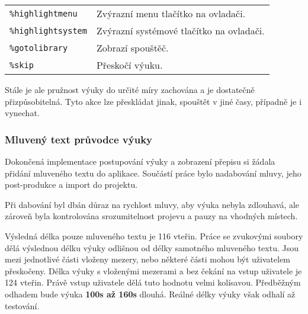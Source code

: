 \begin{longtable}[]{@{}ll@{}}
\begin{minipage}[t]{0.05\columnwidth}
\texttt{\%highlightmenu}\strut
\end{minipage} & \begin{minipage}[t]{0.05\columnwidth}\raggedright\strut
Zvýrazní menu tlačítko na ovladači.\strut
\end{minipage}\tabularnewline
\begin{minipage}[t]{0.05\columnwidth}\raggedright\strut
\texttt{\%highlightsystem}\strut
\end{minipage} & \begin{minipage}[t]{0.05\columnwidth}\raggedright\strut
Zvýrazní systémové tlačítko na ovladači.\strut
\end{minipage}\tabularnewline
\begin{minipage}[t]{0.05\columnwidth}\raggedright\strut
\texttt{\%gotolibrary}\strut
\end{minipage} & \begin{minipage}[t]{0.05\columnwidth}\raggedright\strut
Zobrazí spouštěč.\strut
\end{minipage}\tabularnewline
\begin{minipage}[t]{0.05\columnwidth}\raggedright\strut
\texttt{\%skip}\strut
\end{minipage} & \begin{minipage}[t]{0.05\columnwidth}\raggedright\strut
Přeskočí výuku.\strut
\end{minipage}\tabularnewline
\bottomrule
\end{longtable}

Stále je ale pružnost výuky do určité míry zachována a je dostatečně
přizpůsobitelná. Tyto akce lze přeskládat jinak, spouštět v jiné časy,
případně je i vynechat.

\subsubsection{Mluvený text průvodce
výuky}\label{mluvenuxfd-text-prux16fvodce-vuxfduky}

Dokončená implementace postupování výuky a zobrazení přepisu si žádala
přidání mluveného textu do aplikace. Součástí práce bylo nadabování
mluvy, jeho post-produkce a import do projektu.

Při dabování byl dbán důraz na rychlost mluvy, aby výuka nebyla
zdlouhavá, ale zároveň byla kontrolována srozumitelnost projevu a pauzy
na vhodných místech.

Výsledná délka pouze mluveného textu je 116 vteřin. Práce se zvukovými
soubory dělá výslednou délku výuky odlišnou od délky samotného mluveného
textu. Jsou mezi jednotlivé části vloženy mezery, nebo některé části
mohou být uživatelem přeskočeny. Délka výuky s vloženými mezerami a bez
čekání na vstup uživatele je 124 vteřin. Právě vstup uživatele dělá tuto
hodnotu velmi kolísavou. Předběžným odhadem bude výuka \textbf{100s až
160s} dlouhá. Reálné délky výuky však odhalí až testování.

